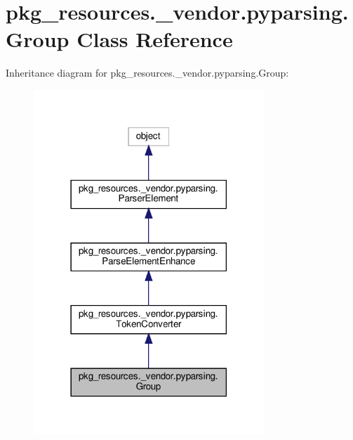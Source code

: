 \hypertarget{classpkg__resources_1_1__vendor_1_1pyparsing_1_1Group}{}\section{pkg\+\_\+resources.\+\_\+vendor.\+pyparsing.\+Group Class Reference}
\label{classpkg__resources_1_1__vendor_1_1pyparsing_1_1Group}


Inheritance diagram for pkg\+\_\+resources.\+\_\+vendor.\+pyparsing.\+Group\+:
\nopagebreak
\begin{figure}[H]
\begin{center}
\leavevmode
\includegraphics[width=246pt]{classpkg__resources_1_1__vendor_1_1pyparsing_1_1Group__inherit__graph}
\end{center}
\end{figure}


